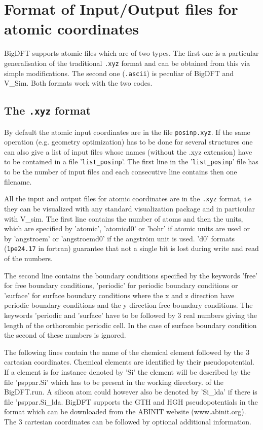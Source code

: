 \documentclass[a4paper,11pt]{report}
\begin{document}
\section{Format of Input/Output files for atomic coordinates} 
BigDFT supports atomic files which are of two types.
The first one is a particular generalisation of the traditional \texttt{.xyz} format and can be obtained from this via simple modifications.
The second one (\texttt{.ascii}) is peculiar of BigDFT and V\_Sim. Both formats work with the two codes.
\subsection{The \texttt{.xyz} format}
By default the atomic input coordinates are in the file \texttt{posinp.xyz}.
If the same operation (e.g. geometry optimization) 
has to be done for several structures one can also give a list of input files whose names (without the .xyz extension) 
have to be contained in a file '\texttt{list\_posinp}'. The first line in the '\texttt{list\_posinp}' file has to be the number of input 
files and each consecutive line contains then one filename.

All the input and output files for atomic coordinates are in the \texttt{.xyz} format, i.e they can be visualized with any 
standard visualization package and in particular with V\_sim. The first line contains the number of atoms 
and then the units, which are specified by 'atomic', 'atomicd0' or 'bohr' if atomic units are used or by 
'angstroem' or 'angstroemd0' if the angstr\"om unit is used. 'd0' formats (\texttt{1pe24.17} in fortran) guarantee that not a single bit is 
lost during write and read of the numbers.

The second line contains the boundary conditions specified by the keywords 'free' for free boundary 
conditions, 'periodic' for periodic boundary conditions or 'surface' for surface boundary conditions
where the x and z direction have periodic boundary conditions and the y direction free boundary conditions. 
The keywords 'periodic and 'surface' have to be followed by 3 real numbers giving the length of the 
orthorombic periodic cell. In the case of surface boundary condition the second of these numbers is ignored.

The following lines contain the name of the chemical element followed by the 3 cartesian coordinates. 
Chemical elements are identified by their pseudopotential. If a element is for instance denoted by 
'Si' the element will be described by the file 'psppar.Si' which has to be present in the working directory.
of the BigDFT.run. A silicon atom could however also be denoted by 'Si\_lda' if there is file 'psppar.Si\_lda.
BigDFT supports the GTH and HGH pseudopotentials in the format which can be downloaded from the ABINIT website
(www.abinit.org). The 3 cartesian coordinates can be followed by optional additional information.
\end{document}
